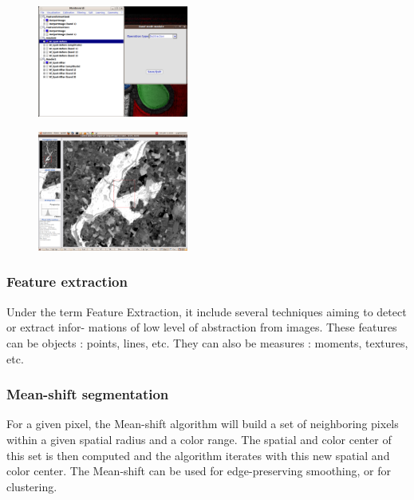 \begin{figure}
  \center
  \includegraphics[width=0.44\textwidth]{../Art/MonteverdiImages/monteverdi_band_math_substraction.png}
  \label{fig:concatenate}
\end{figure}

\begin{figure}
  \center
  \includegraphics[width=0.44\textwidth]{../Art/MonteverdiImages/monteverdi_NDWI2_substraction.png}
  \label{fig:ndwi2}
\end{figure}

\subsubsection{Feature extraction}

Under the term Feature Extraction, it include several techniques
aiming to detect or extract infor- mations of low level of abstraction
from images. These features can be objects : points, lines, etc.  They
can also be measures : moments, textures, etc.

\subsubsection{Mean-shift segmentation}

For a given pixel, the Mean-shift algorithm will build a set of
neighboring pixels within a given spatial radius and a color
range. The spatial and color center of this set is then computed and
the algorithm iterates with this new spatial and color center. The
Mean-shift can be used for edge-preserving smoothing, or for
clustering.

